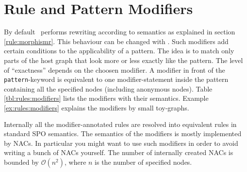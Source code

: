 \section{Rule and Pattern Modifiers} 
\label{sct:patternmodifier}
By default \GrG\ performs rewriting according to  semantics as explained in section \ref{rule:morphismr}.
This behaviour can be changed with .
Such modifiers add certain conditions to the applicability of a pattern.
The idea is to match only parts of the host graph that look more or less exactly like the pattern.
The level of ``exactness'' depends on the choosen modifier.
A modifier in front of the \texttt{pattern}-keyword is equivalent to one modifier-statement inside the pattern containing all the specified nodes (including anonymous nodes).
Table \ref{tbl:rules:modifiers} lists the modifiers with their semantics.
Example \ref{ex:rules:modifiers} explains the modifiers by small toy-graphs.
\begin{note}
    Internally all the modifier-annotated rules are resolved into equivalent rules in standard SPO semantics.
    The semantics of the modifiers is mostly implemented by NACs.
    In particular you might want to use such modifiers in order to avoid writing a bunch of NACs yourself.
    The number of internally created NACs is bounded by $\mathcal{O}(n^2)$, where $n$ is the number of specified nodes.
\end{note} 
